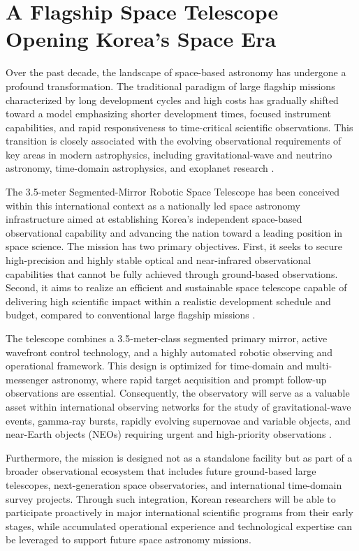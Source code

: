 \chapter{A Flagship Space Telescope Opening Korea's Space Era}

Over the past decade, the landscape of space-based astronomy has undergone a profound transformation. The traditional paradigm of large flagship missions characterized by long development cycles and high costs has gradually shifted toward a model emphasizing shorter development times, focused instrument capabilities, and rapid responsiveness to time-critical scientific observations. This transition is closely associated with the evolving observational requirements of key areas in modern astrophysics, including gravitational-wave and neutrino astronomy, time-domain astrophysics, and exoplanet research \cite{abbott2017,margutti2019}.

The 3.5-meter Segmented-Mirror Robotic Space Telescope has been conceived within this international context as a nationally led space astronomy infrastructure aimed at establishing Korea's independent space-based observational capability and advancing the nation toward a leading position in space science. The mission has two primary objectives. First, it seeks to secure high-precision and highly stable optical and near-infrared observational capabilities that cannot be fully achieved through ground-based observations. Second, it aims to realize an efficient and sustainable space telescope capable of delivering high scientific impact within a realistic development schedule and budget, compared to conventional large flagship missions \cite{roman2026}.

The telescope combines a 3.5-meter-class segmented primary mirror, active wavefront control technology, and a highly automated robotic observing and operational framework. This design is optimized for time-domain and multi-messenger astronomy, where rapid target acquisition and prompt follow-up observations are essential. Consequently, the observatory will serve as a valuable asset within international observing networks for the study of gravitational-wave events, gamma-ray bursts, rapidly evolving supernovae and variable objects, and near-Earth objects (NEOs) requiring urgent and high-priority observations \cite{abbott2017,ivezic2019}.

Furthermore, the mission is designed not as a standalone facility but as part of a broader observational ecosystem that includes future ground-based large telescopes, next-generation space observatories, and international time-domain survey projects. Through such integration, Korean researchers will be able to participate proactively in major international scientific programs from their early stages, while accumulated operational experience and technological expertise can be leveraged to support future space astronomy missions.

